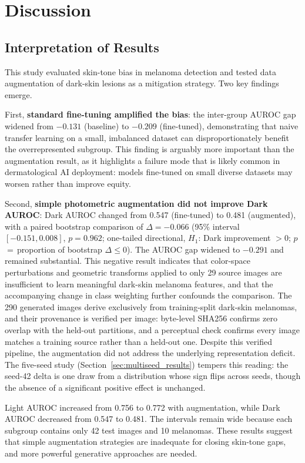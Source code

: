 \section{Discussion}

\subsection{Interpretation of Results}

This study evaluated skin-tone bias in melanoma detection and tested data augmentation of dark-skin lesions as a mitigation strategy. Two key findings emerge.

First, \textbf{standard fine-tuning amplified the bias}: the inter-group AUROC gap widened from $-0.131$ (baseline) to $-0.209$ (fine-tuned), demonstrating that naive transfer learning on a small, imbalanced dataset can disproportionately benefit the overrepresented subgroup. This finding is arguably more important than the augmentation result, as it highlights a failure mode that is likely common in dermatological AI deployment: models fine-tuned on small diverse datasets may worsen rather than improve equity.

Second, \textbf{simple photometric augmentation did not improve Dark AUROC}: Dark AUROC changed from 0.547 (fine-tuned) to 0.481 (augmented), with a paired bootstrap comparison of $\Delta=-0.066$ (95\% interval $[-0.151,0.008]$, $p=0.962$; one-tailed directional, $H_1$: Dark improvement $>0$; $p$\,$=$\,proportion of bootstrap $\Delta \leq 0$). The AUROC gap widened to $-0.291$ and remained substantial. This negative result indicates that color-space perturbations and geometric transforms applied to only 29 source images are insufficient to learn meaningful dark-skin melanoma features, and that the accompanying change in class weighting further confounds the comparison. The 290 generated images derive exclusively from training-split dark-skin melanomas, and their provenance is verified per image: byte-level SHA256 confirms zero overlap with the held-out partitions, and a perceptual check confirms every image matches a training source rather than a held-out one. Despite this verified pipeline, the augmentation did not address the underlying representation deficit. The five-seed study (Section~\ref{sec:multiseed_results}) tempers this reading: the seed-42 delta is one draw from a distribution whose sign flips across seeds, though the absence of a significant positive effect is unchanged.

Light AUROC increased from 0.756 to 0.772 with augmentation, while Dark AUROC decreased from 0.547 to 0.481. The intervals remain wide because each subgroup contains only 42 test images and 10 melanomas. These results suggest that simple augmentation strategies are inadequate for closing skin-tone gaps, and more powerful generative approaches are needed.

